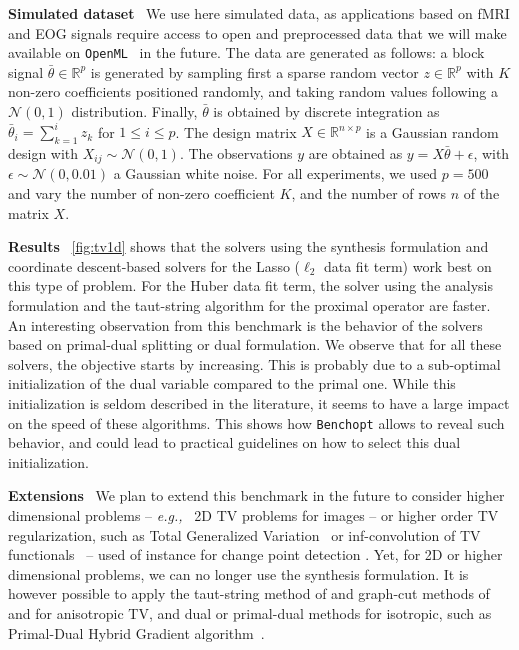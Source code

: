 \documentclass{article}
\newcommand{\eg}{{\em e.g.,~}}
\newcommand{\Benchopt}{{{\texttt{Benchopt}}}}
\newcommand{\OpenML}{\texttt{OpenML}}
\newcommand{\myparagraph}[1]{\vspace{1mm}\noindent\textbf{#1} \,}
\begin{document}
\newpage

\myparagraph{Simulated dataset}
We use here simulated data, as applications based on fMRI and EOG signals require access to open and preprocessed data that we will make available on \OpenML{}~\cite{OpenML2013} in the future.
The data are generated as follows: a block signal $\bar \theta \in \mathbb R^p$ is generated by sampling first a sparse random vector $z \in \mathbb R^p$ with $K$ non-zero coefficients positioned randomly, and taking random values following a $\mathcal{N}(0,1)$ distribution.
Finally, $\bar \theta$ is obtained by discrete integration as $\bar \theta_i = \sum_{k=1}^{i} z_k$ for $1 \leq i \leq p$.
The design matrix $X \in \mathbb R^{n \times p}$ is a Gaussian random design with  $X_{ij} \sim \mathcal N(0, 1)$.
The observations $y$ are obtained as $y = X \bar \theta + \epsilon$, with $\epsilon \sim \mathcal{N}(0,0.01)$ a Gaussian white noise.
For all experiments, we used $p=500$ and vary the number of non-zero coefficient $K$, and the number of rows $n$ of the matrix $X$.

\myparagraph{Results} \autoref{fig:tv1d} shows that the solvers using the synthesis formulation and coordinate descent-based solvers for the Lasso ($\ell_2$ data fit term) work best on this type of problem.
For the Huber data fit term, the solver using the analysis formulation and the taut-string algorithm for the proximal operator are faster.
An interesting observation from this benchmark is the behavior of the solvers based on primal-dual splitting or dual formulation. We observe that for all these solvers, the objective starts by increasing. This is probably due to a sub-optimal initialization of the dual variable compared to the primal one. While this initialization is seldom described in the literature, it seems to have a large impact on the speed of these algorithms. This shows how \Benchopt{} allows to reveal such behavior, and could lead to practical guidelines on how to select this dual initialization.

\myparagraph{Extensions} We plan to extend this benchmark in the future to consider higher dimensional problems -- \eg{} 2D TV problems for images -- or higher order TV regularization, such as Total Generalized Variation~\cite{bredies2010total} or inf-convolution of TV functionals~\cite{chambolle1997image} -- used of instance for change point detection \citep{Tibshirani2014}. Yet, for 2D or higher dimensional problems, we can no longer use the synthesis formulation. It is however possible to apply the taut-string method of \citet{taut_string} and graph-cut methods of \citet{Boykov2001} and \citet{Kolmogorov2004} for anisotropic TV, and dual or primal-dual methods for isotropic, such as Primal-Dual Hybrid Gradient algorithm~\citep{ChambollePock2011}.
\clearpage{}
\end{document}
